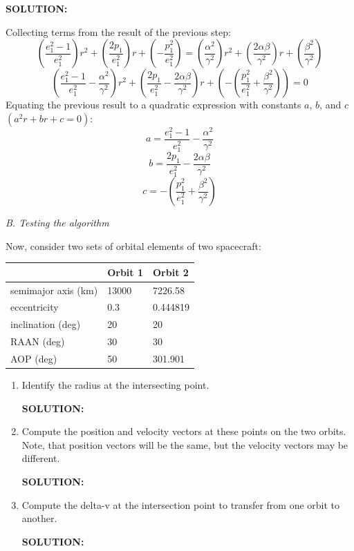 \documentclass[12pt, letterpaper]{aiaa-tc}
\begin{document}
\begin{enumerate}
    \textbf{SOLUTION:}

    Collecting terms from the result of the previous step:
    \[ \left(\frac{e_1^2-1}{e_1^2}\right)r^2+\left(\frac{2p_1}{e_1^2}\right)r+\left(-\frac{p_1^2}{e_1^2}\right)=\left(\frac{\alpha^2}{\gamma^2}\right)r^2+\left(\frac{2\alpha\beta}{\gamma^2}\right)r+\left(\frac{\beta^2}{\gamma^2}\right) \]
    \[ \left(\frac{e_1^2-1}{e_1^2}-\frac{\alpha^2}{\gamma^2}\right)r^2+\left(\frac{2p_1}{e_1^2}-\frac{2\alpha\beta}{\gamma^2}\right)r+\left(-\left(\frac{p_1^2}{e_1^2}+\frac{\beta^2}{\gamma^2}\right)\right)=0 \]
    Equating the previous result to a quadratic expression with constants $a$, $b$, and $c$ $\left(a^2r+br+c=0\right)$:
    \[ a=\frac{e_1^2-1}{e_1^2}-\frac{\alpha^2}{\gamma^2} \]
    \[ b=\frac{2p_1}{e_1^2}-\frac{2\alpha\beta}{\gamma^2} \]
    \[ c=-\left(\frac{p_1^2}{e_1^2}+\frac{\beta^2}{\gamma^2}\right) \]
\end{enumerate}

\raggedright \textit{B. Testing the algorithm}

Now, consider two sets of orbital elements of two spacecraft:


\begin{table}[h]
    \centering
    \begin{tabular}{|l|l|l|}
    \hline
                        & Orbit 1 & Orbit 2  \\ \hline
    semimajor axis (km) & 13000   & 7226.58  \\
    eccentricity        & 0.3     & 0.444819 \\
    inclination (deg)   & 20      & 20       \\
    RAAN (deg)          & 30      & 30       \\
    AOP (deg)           & 50      & 301.901  \\ \hline
    \end{tabular}
\end{table}

\begin{enumerate}
    \item Identify the radius at the intersecting point.
    
    \textbf{SOLUTION:}

    \item Compute the position and velocity vectors at these points on the two orbits. Note, that position vectors will
    be the same, but the velocity vectors may be different.
    
    \textbf{SOLUTION:}

    \item Compute the delta-v at the intersection point to transfer from one orbit to another.
    
    \textbf{SOLUTION:}

\end{enumerate}
\end{document}
